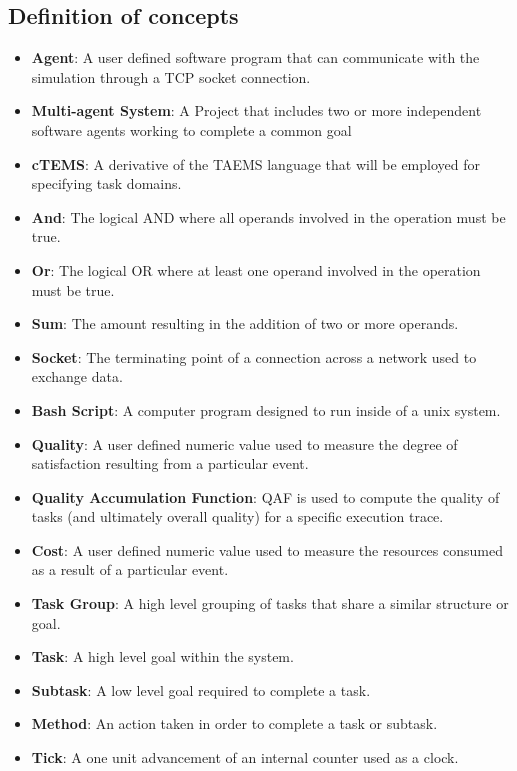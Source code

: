 \documentclass{article}
\begin{document}
\subsection{Definition of concepts}
\begin{itemize}
\item{\textbf{Agent}: A user defined software program that can communicate with the simulation through a TCP socket connection.}

\item{\textbf{Multi-agent System}: A Project that includes two or more independent software agents working to complete a common goal}

\item{\textbf{cTEMS}: A derivative of the TAEMS language that will be employed for specifying task domains.}

\item{\textbf{And}: The logical AND where all operands involved in the operation must be true.}

\item{\textbf{Or}: The logical OR where at least one operand involved in the operation must be true.}

\item{\textbf{Sum}: The amount resulting in the addition of two or more operands.}

\item{\textbf{Socket}: The terminating point of a connection across a network used to exchange data.}

\item{\textbf{Bash Script}:  A computer program designed to run inside of a unix system.}

\item{\textbf{Quality}: A user defined numeric value used to measure the degree of satisfaction resulting from a particular event.}

\item{\textbf{Quality Accumulation Function}: QAF is used to compute the quality of tasks (and ultimately overall quality) for a specific execution trace.}

\item{\textbf{Cost}: A user defined numeric value used to measure the resources consumed as a result of a particular event.}

\item{\textbf{Task Group}: A high level grouping of tasks that share a similar structure or goal.}

\item{\textbf{Task}: A high level goal within the system.}

\item{\textbf{Subtask}: A low level goal required to complete a task.}

\item{\textbf{Method}: An action taken in order to complete a task or subtask.}

\item{\textbf{Tick}: A one unit advancement of an internal counter used as a clock.}
\end{itemize}
\end{document}
